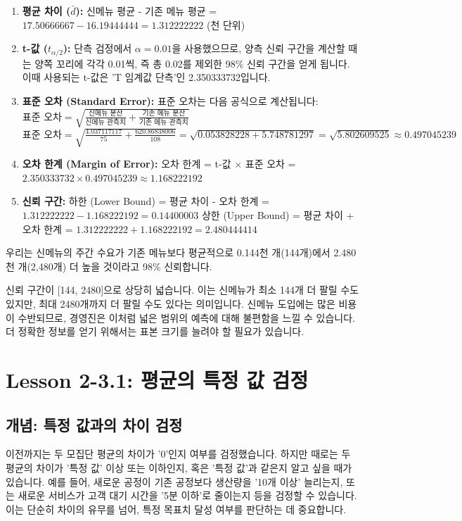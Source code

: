 \documentclass[11pt,a4paper]{book}
\theoremstyle{definition}
\begin{document}
\begin{enumerate}
    \item \textbf{평균 차이 ($\bar{d}$):}
    신메뉴 평균 - 기존 메뉴 평균 = $17.50666667 - 16.19444444 = 1.312222222$ (천 단위)
    \item \textbf{t-값 ($t_{\alpha/2}$):}
    단측 검정에서 $\alpha = 0.01$을 사용했으므로, 양측 신뢰 구간을 계산할 때는 양쪽 꼬리에 각각 0.01씩, 즉 총 0.02를 제외한 98\% 신뢰 구간을 얻게 됩니다. 이때 사용되는 t-값은 'T 임계값 단측'인 2.350333732입니다.
    \item \textbf{표준 오차 (Standard Error):}
    표준 오차는 다음 공식으로 계산됩니다:
    $\text{표준 오차} = \sqrt{\frac{\text{신메뉴 분산}}{\text{신메뉴 관측치}} + \frac{\text{기존 메뉴 분산}}{\text{기존 메뉴 관측치}}}$
    $\text{표준 오차} = \sqrt{\frac{4.037117117}{75} + \frac{620.86838006}{108}} = \sqrt{0.053828228 + 5.748781297} = \sqrt{5.802609525} \approx 0.497045239$
    \item \textbf{오차 한계 (Margin of Error):}
    오차 한계 = t-값 $\times$ 표준 오차 = $2.350333732 \times 0.497045239 \approx 1.168222192$
    \item \textbf{신뢰 구간:}
    하한 (Lower Bound) = 평균 차이 - 오차 한계 = $1.312222222 - 1.168222192 = 0.14400003$
    상한 (Upper Bound) = 평균 차이 + 오차 한계 = $1.312222222 + 1.168222192 = 2.480444414$
\end{enumerate}

\begin{summarybox}[title=98\% 신뢰 구간 해석]
우리는 신메뉴의 주간 수요가 기존 메뉴보다 평균적으로 0.144천 개(144개)에서 2.480천 개(2,480개) 더 높을 것이라고 98\% 신뢰합니다.
\end{summarybox}

\begin{warningbox}[title=경영진의 의사결정]
신뢰 구간이 [144, 2480]으로 상당히 넓습니다. 이는 신메뉴가 최소 144개 더 팔릴 수도 있지만, 최대 2480개까지 더 팔릴 수도 있다는 의미입니다. 신메뉴 도입에는 많은 비용이 수반되므로, 경영진은 이처럼 넓은 범위의 예측에 대해 불편함을 느낄 수 있습니다. 더 정확한 정보를 얻기 위해서는 표본 크기를 늘려야 할 필요가 있습니다.
\end{warningbox}


\section{Lesson 2-3.1: 평균의 특정 값 검정}

\subsection{개념: 특정 값과의 차이 검정}
이전까지는 두 모집단 평균의 차이가 '0'인지 여부를 검정했습니다. 하지만 때로는 두 평균의 차이가 '특정 값' 이상 또는 이하인지, 혹은 '특정 값'과 같은지 알고 싶을 때가 있습니다. 예를 들어, 새로운 공정이 기존 공정보다 생산량을 '10개 이상' 늘리는지, 또는 새로운 서비스가 고객 대기 시간을 '5분 이하'로 줄이는지 등을 검정할 수 있습니다. 이는 단순히 차이의 유무를 넘어, 특정 목표치 달성 여부를 판단하는 데 중요합니다.
\end{document}
